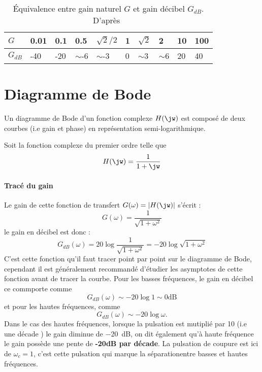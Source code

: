 \begin{table}[!t]
    \begin{tabular}{@{}P{1cm}P{1cm}P{1cm}P{1cm}P{1cm}
                       P{1cm}P{1cm}P{1cm}P{1cm}P{1cm}@{}}
    \toprule
    $G$      & 0.01&0.1&0.5     &$\sqrt{2}/2$&1&$\sqrt{2}$&2       &10&100   \\
    \midrule
    $G_{dB}$ & -40 &-20&$\sim$-6&$\sim$-3    &0&$\sim$3   &$\sim$6 & 20 & 40 \\
    \bottomrule
    \end{tabular}
    \caption{\'Equivalence entre gain naturel $G$ et gain 
             décibel $G_{dB}$. D'après~\cite{laroche}\label{tab-equiv_dB}}
\end{table}


\section{Diagramme de Bode}

Un diagramme de Bode d'un fonction complexe $H(\jw)$ est composé de deux 
courbes (i.e gain et phase) en représentation semi-logarithmique.

Soit la fonction complexe du premier ordre telle que 
\begin{align}
H(\jw)=\dfrac{1}{1+\jw}\label{eq-ft_annexe}
\end{align}

\paragraph{Tracé du gain}
Le gain de cette fonction de transfert $G(\omega)=|H(\jw)|$ s'écrit :
$$
G(\omega)=\dfrac{1}{\sqrt{1+\omega^2}}
$$
le gain en décibel est donc :
$$
G_{dB}(\omega)=20\log{\dfrac{1}{\sqrt{1+\omega^2}}}=-20\log{\sqrt{1+\omega^2}}
$$
C'est cette fonction qu'il faut tracer point par point sur le diagramme 
de Bode, cependant il est généralement recommandé d'étudier les asymptotes 
de cette fonction avant de tracer la courbe. Pour les basses fréquences, le 
gain en décibel ce commporte comme 
$$
G_{dB}(\omega)\sim-20\log{1}\sim 0\text{dB}
$$ 
et pour les hautes fréquences, comme
$$
G_{dB}(\omega)\sim -20\log{\omega}.
$$
Dans le cas des hautes fréquences, lorsque la pulsation est mutiplié par 
10 (i.e une décade ) le gain diminue de \SI{-20}{\dB}, on dit également 
qu'à haute fréquence le gain possède une pente de \textbf{-20dB par décade}. 
La pulsation de coupure est ici de $\omega_{c}=1$, c'est cette pulsation qui 
marque la \og séparation\fg entre basses et hautes fréquences. 


